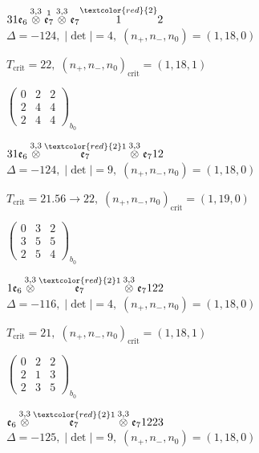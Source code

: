\documentclass[10pt]{article}
\begin{document}
$31\mathfrak{e}_6\overset{3,3}{\otimes}\overset{1}{\mathfrak{e}_7}\overset{3,3}{\otimes}\mathfrak{e}_7\overset{\textcolor{red}{2}}{1}2$ \quad $\Delta=-124,\; |\det|=4,\; (n_+,n_-,n_0)=(1,18,0)$

\hspace{1em}$T_{\text{crit}}=22,\; (n_+,n_-,n_0)_{\text{crit}}=(1,18,1)$

\hspace{2em}$\left(\begin{smallmatrix}0 & 2 & 2 \\ 2 & 4 & 4 \\ 2 & 4 & 4\end{smallmatrix}\right)_{\!b_0}$

$31\mathfrak{e}_6\overset{3,3}{\otimes}\overset{\textcolor{red}{2}1}{\mathfrak{e}_7}\overset{3,3}{\otimes}\mathfrak{e}_712$ \quad $\Delta=-124,\; |\det|=9,\; (n_+,n_-,n_0)=(1,18,0)$

\hspace{1em}$T_{\text{crit}}=21.56 \to 22,\; (n_+,n_-,n_0)_{\text{crit}}=(1,19,0)$

\hspace{2em}$\left(\begin{smallmatrix}0 & 3 & 2 \\ 3 & 5 & 5 \\ 2 & 5 & 4\end{smallmatrix}\right)_{\!b_0}$

\smallskip

$1\mathfrak{e}_6\overset{3,3}{\otimes}\overset{\textcolor{red}{2}1}{\mathfrak{e}_7}\overset{3,3}{\otimes}\mathfrak{e}_7122$ \quad $\Delta=-116,\; |\det|=4,\; (n_+,n_-,n_0)=(1,18,0)$

\hspace{1em}$T_{\text{crit}}=21,\; (n_+,n_-,n_0)_{\text{crit}}=(1,18,1)$

\hspace{2em}$\left(\begin{smallmatrix}0 & 2 & 2 \\ 2 & 1 & 3 \\ 2 & 3 & 5\end{smallmatrix}\right)_{\!b_0}$

\smallskip

$\mathfrak{e}_6\overset{3,3}{\otimes}\overset{\textcolor{red}{2}1}{\mathfrak{e}_7}\overset{3,3}{\otimes}\mathfrak{e}_71223$ \quad $\Delta=-125,\; |\det|=9,\; (n_+,n_-,n_0)=(1,18,0)$
\end{document}
